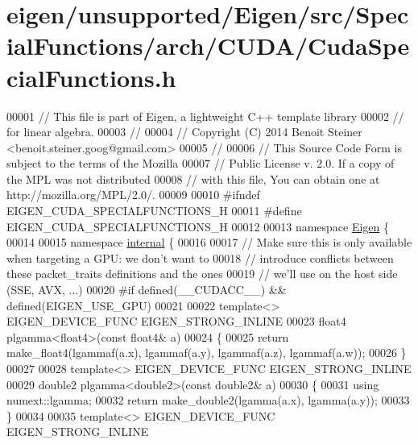 \hypertarget{eigen_2unsupported_2_eigen_2src_2_special_functions_2arch_2_c_u_d_a_2_cuda_special_functions_8h_source}{}\section{eigen/unsupported/\+Eigen/src/\+Special\+Functions/arch/\+C\+U\+D\+A/\+Cuda\+Special\+Functions.h}
\label{eigen_2unsupported_2_eigen_2src_2_special_functions_2arch_2_c_u_d_a_2_cuda_special_functions_8h_source}

\begin{DoxyCode}
00001 \textcolor{comment}{// This file is part of Eigen, a lightweight C++ template library}
00002 \textcolor{comment}{// for linear algebra.}
00003 \textcolor{comment}{//}
00004 \textcolor{comment}{// Copyright (C) 2014 Benoit Steiner <benoit.steiner.goog@gmail.com>}
00005 \textcolor{comment}{//}
00006 \textcolor{comment}{// This Source Code Form is subject to the terms of the Mozilla}
00007 \textcolor{comment}{// Public License v. 2.0. If a copy of the MPL was not distributed}
00008 \textcolor{comment}{// with this file, You can obtain one at http://mozilla.org/MPL/2.0/.}
00009 
00010 \textcolor{preprocessor}{#ifndef EIGEN\_CUDA\_SPECIALFUNCTIONS\_H}
00011 \textcolor{preprocessor}{#define EIGEN\_CUDA\_SPECIALFUNCTIONS\_H}
00012 
00013 \textcolor{keyword}{namespace }\hyperlink{namespace_eigen}{Eigen} \{
00014 
00015 \textcolor{keyword}{namespace }\hyperlink{namespaceinternal}{internal} \{
00016 
00017 \textcolor{comment}{// Make sure this is only available when targeting a GPU: we don't want to}
00018 \textcolor{comment}{// introduce conflicts between these packet\_traits definitions and the ones}
00019 \textcolor{comment}{// we'll use on the host side (SSE, AVX, ...)}
00020 \textcolor{preprocessor}{#if defined(\_\_CUDACC\_\_) && defined(EIGEN\_USE\_GPU)}
00021 
00022 \textcolor{keyword}{template}<> EIGEN\_DEVICE\_FUNC EIGEN\_STRONG\_INLINE
00023 float4 plgamma<float4>(\textcolor{keyword}{const} float4& a)
00024 \{
00025   \textcolor{keywordflow}{return} make\_float4(lgammaf(a.x), lgammaf(a.y), lgammaf(a.z), lgammaf(a.w));
00026 \}
00027 
00028 \textcolor{keyword}{template}<> EIGEN\_DEVICE\_FUNC EIGEN\_STRONG\_INLINE
00029 double2 plgamma<double2>(\textcolor{keyword}{const} double2& a)
00030 \{
00031   \textcolor{keyword}{using} numext::lgamma;
00032   \textcolor{keywordflow}{return} make\_double2(lgamma(a.x), lgamma(a.y));
00033 \}
00034 
00035 \textcolor{keyword}{template}<> EIGEN\_DEVICE\_FUNC EIGEN\_STRONG\_INLINE

\end{DoxyCode}
